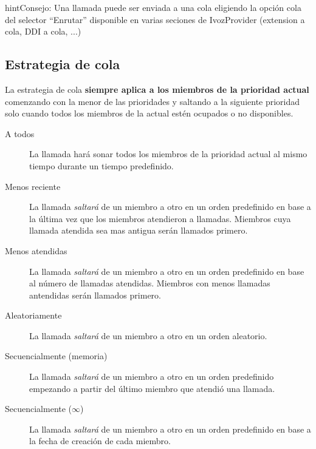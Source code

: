 \documentclass[letterpaper,10pt,spanish]{sphinxmanual}
\begin{document}
\begin{notice}{hint}{Consejo:}
Una llamada puede ser enviada a una cola eligiendo la opción cola del selector ``Enrutar'' disponible en varias seciones de IvozProvider (extension a cola, DDI a cola, ...)
\end{notice}


\subsection{Estrategia de cola}
\label{pbx_features/queues:queue-strategy}
La estrategia de cola \textbf{siempre aplica a los miembros de la prioridad actual} comenzando con la menor de las prioridades y saltando a la siguiente prioridad solo cuando todos los miembros de la actual estén ocupados o no disponibles.
\begin{description}
\item[{A todos}] \leavevmode{}\label{pbx_features/queues:term-ring-all}
La llamada hará sonar todos los miembros de la prioridad actual al mismo tiempo durante un tiempo predefinido.

\item[{Menos reciente}] \leavevmode{}\label{pbx_features/queues:term-least-recent}
La llamada \emph{saltará} de un miembro a otro en un orden predefinido en base a la última vez que los miembros atendieron a llamadas. Miembros cuya llamada atendida sea mas antigua serán llamados primero.

\item[{Menos atendidas}] \leavevmode{}\label{pbx_features/queues:term-fewer-calls}
La llamada \emph{saltará} de un miembro a otro en un orden predefinido en base al número de llamadas atendidas. Miembros con menos llamadas antendidas serán llamados primero.

\item[{Aleatoriamente}] \leavevmode{}\label{pbx_features/queues:term-random}
La llamada \emph{saltará} de un miembro a otro en un orden aleatorio.

\item[{Secuencialmente (memoria)}] \leavevmode{}\label{pbx_features/queues:term-round-robin-memory}
La llamada \emph{saltará} de un miembro a otro en un orden predefinido empezando a partir del último miembro que atendió una llamada.

\item[{Secuencialmente (\(\infty\))}] \leavevmode{}\label{pbx_features/queues:term-linear}
La llamada \emph{saltará} de un miembro a otro en un orden predefinido en base a la fecha de creación de cada miembro.

\end{description}
\end{document}
